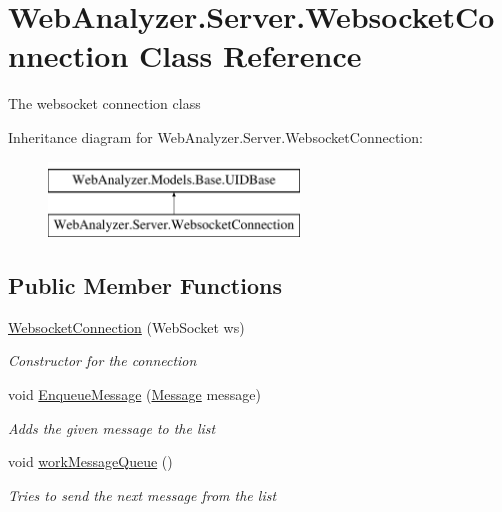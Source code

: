 \hypertarget{class_web_analyzer_1_1_server_1_1_websocket_connection}{}\section{Web\+Analyzer.\+Server.\+Websocket\+Connection Class Reference}
\label{class_web_analyzer_1_1_server_1_1_websocket_connection}


The websocket connection class  


Inheritance diagram for Web\+Analyzer.\+Server.\+Websocket\+Connection\+:\begin{figure}[H]
\begin{center}
\leavevmode
\includegraphics[height=2.000000cm]{class_web_analyzer_1_1_server_1_1_websocket_connection}
\end{center}
\end{figure}
\subsection*{Public Member Functions}
\begin{DoxyCompactItemize}
\item 
\hyperlink{class_web_analyzer_1_1_server_1_1_websocket_connection_af4ada0b7f2d032ad42da1d9238619ebd}{Websocket\+Connection} (Web\+Socket ws)
\begin{DoxyCompactList}\small\item\em Constructor for the connection \end{DoxyCompactList}\item 
void \hyperlink{class_web_analyzer_1_1_server_1_1_websocket_connection_a0450a1a608d5dcb62bddfe2a75aee305}{Enqueue\+Message} (\hyperlink{class_web_analyzer_1_1_models_1_1_message_model_1_1_message}{Message} message)
\begin{DoxyCompactList}\small\item\em Adds the given message to the list \end{DoxyCompactList}\item 
void \hyperlink{class_web_analyzer_1_1_server_1_1_websocket_connection_a325a5138c2af5d5296360cf0abdd1942}{work\+Message\+Queue} ()
\begin{DoxyCompactList}\small\item\em Tries to send the next message from the list \end{DoxyCompactList}\end{DoxyCompactItemize}
